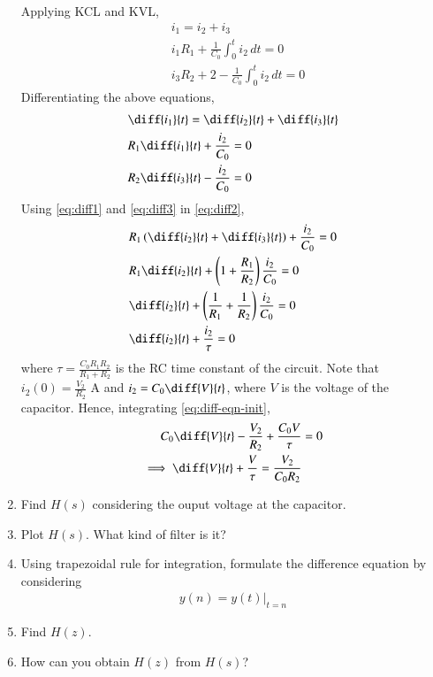 \documentclass[journal,12pt,twocolumn]{IEEEtran}
\renewcommand\thesection{\arabic{section}}
\begin{document}
\begin{enumerate}[label=\arabic*.,ref=\thesection.\theenumi]
Applying KCL and KVL,
\begin{align}
	&i_1 = i_2 + i_3 \\
	&i_1R_1 + \frac{1}{C_0}\int_0^ti_2\, dt = 0 \\
	&i_3R_2 + 2 - \frac{1}{C_0}\int_0^ti_2\, dt = 0
\end{align}
Differentiating the above equations,
\begin{align}
	&\diff{i_1}{t} = \diff{i_2}{t} + \diff{i_3}{t} \label{eq:diff1}\\
	&R_1\diff{i_1}{t} + \frac{i_2}{C_0} = 0 \label{eq:diff2}\\
	&R_2\diff{i_3}{t} - \frac{i_2}{C_0} = 0 
	\label{eq:diff3}
\end{align}
Using \eqref{eq:diff1} and \eqref{eq:diff3} in \eqref{eq:diff2},
\begin{align}
	&R_1\brak{\diff{i_2}{t} + \diff{i_3}{t}} + \frac{i_2}{C_0} = 0 \\
	&R_1\diff{i_2}{t} + \brak{1 + \frac{R_1}{R_2}}\frac{i_2}{C_0} = 0 \\
	&\diff{i_2}{t} + \brak{\frac{1}{R_1} + \frac{1}{R_2}}\frac{i_2}{C_0} = 0 \\
	&\diff{i_2}{t} + \frac{i_2}{\tau} = 0
	\label{eq:diff-eqn-init}
\end{align}
where $\tau = \frac{C_0R_1R_2}{R_1 + R_2}$ is the RC time 
constant of the circuit. Note that $i_2(0) = \frac{V_2}{R_2}$ A and 
$i_2 = C_0\diff{V}{t}$, where $V$ is the voltage of the capacitor. 
Hence, integrating \eqref{eq:diff-eqn-init},
\begin{align}
	C_0\diff{V}{t} - \frac{V_2}{R_2} + \frac{C_0V}{\tau} &= 0 \\
	\implies \diff{V}{t} + \frac{V}{\tau} = \frac{V_2}{C_0R_2}
	\label{eq:diff-eqn}
\end{align}
\item 			Find $H(s)$ considering the ouput voltage at the capacitor.
\item Plot $H(s)$.  What kind of filter is it?
\item Using trapezoidal rule for integration, formulate the difference equation
by considering 
\begin{align}
	y(n) = y(t)\vert_{t=n}
\end{align}
\item Find $H(z)$.
\item How can you obtain $H(z)$ from $H(s)$?
\end{enumerate}
\end{document}

